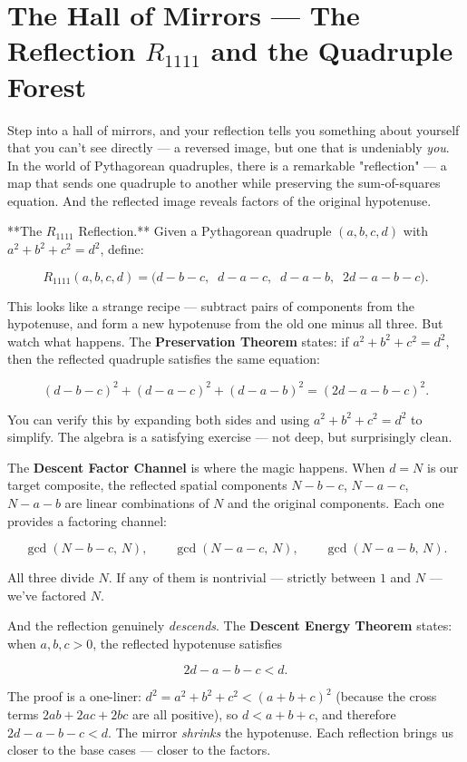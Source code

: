 \bigskip

\section*{The Hall of Mirrors --- The Reflection $R_{1111}$ and the Quadruple Forest}

Step into a hall of mirrors, and your reflection tells you something about yourself that you can't see directly --- a reversed image, but one that is undeniably \textit{you}. In the world of Pythagorean quadruples, there is a remarkable "reflection" --- a map that sends one quadruple to another while preserving the sum-of-squares equation. And the reflected image reveals factors of the original hypotenuse.

**The $R_{1111}$ Reflection.** Given a Pythagorean quadruple $(a, b, c, d)$ with $a^2 + b^2 + c^2 = d^2$, define:

\[
R_{1111}(a, b, c, d) = \big(d - b - c,\;\; d - a - c,\;\; d - a - b,\;\; 2d - a - b - c\big).
\]

This looks like a strange recipe --- subtract pairs of components from the hypotenuse, and form a new hypotenuse from the old one minus all three. But watch what happens. The \textbf{Preservation Theorem} states: if $a^2 + b^2 + c^2 = d^2$, then the reflected quadruple satisfies the same equation:

\[
(d - b - c)^2 + (d - a - c)^2 + (d - a - b)^2 = (2d - a - b - c)^2.
\]

You can verify this by expanding both sides and using $a^2 + b^2 + c^2 = d^2$ to simplify. The algebra is a satisfying exercise --- not deep, but surprisingly clean.

The \textbf{Descent Factor Channel} is where the magic happens. When $d = N$ is our target composite, the reflected spatial components $N - b - c$, $N - a - c$, $N - a - b$ are linear combinations of $N$ and the original components. Each one provides a factoring channel:

\[
\gcd(N - b - c, \, N), \qquad \gcd(N - a - c, \, N), \qquad \gcd(N - a - b, \, N).
\]

All three divide $N$. If any of them is nontrivial --- strictly between $1$ and $N$ --- we've factored $N$.

And the reflection genuinely \textit{descends}. The \textbf{Descent Energy Theorem} states: when $a, b, c > 0$, the reflected hypotenuse satisfies

\[
2d - a - b - c < d.
\]

The proof is a one-liner: $d^2 = a^2 + b^2 + c^2 < (a + b + c)^2$ (because the cross terms $2ab + 2ac + 2bc$ are all positive), so $d < a + b + c$, and therefore $2d - a - b - c < d$. The mirror \textit{shrinks} the hypotenuse. Each reflection brings us closer to the base cases --- closer to the factors.


